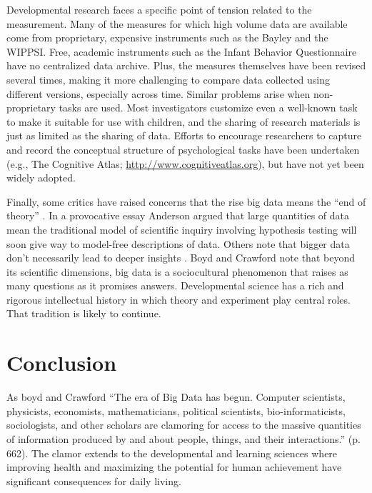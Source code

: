\documentclass[letterpaper,man,apacite,natbib]{apa6}
\begin{document}
Developmental research faces a specific point of tension related to the measurement.
Many of the measures for which high volume data are available come from proprietary, expensive instruments such as the Bayley and the WIPPSI.
Free, academic instruments such as the Infant Behavior Questionnaire have no centralized data archive.
Plus, the measures themselves have been revised several times, making it more challenging to compare data collected using different versions, especially across time.
Similar problems arise when non-proprietary tasks are used.
Most investigators customize even a well-known task to make it suitable for use with children, and the sharing of research materials is just as limited as the sharing of data.
Efforts to encourage researchers to capture and record the conceptual structure of psychological tasks have been undertaken (e.g., The Cognitive Atlas; \url{http://www.cognitiveatlas.org}), but have not yet been widely adopted.

Finally, some critics have raised concerns that the rise big data means the ``end of theory'' \cite{anderson_end_2008}.
In a provocative essay Anderson \citeyear{anderson_end_2008} argued that large quantities of data mean the traditional model of scientific inquiry involving hypothesis testing will soon give way to model-free descriptions of data.
Others note that bigger data don't necessarily lead to deeper insights \cite{graham_big_2012}.
Boyd and Crawford \cite{boyd_critical_2012} note that beyond its scientific dimensions, big data is a sociocultural phenomenon that raises as many questions as it promises answers.
Developmental science has a rich and rigorous intellectual history in which theory and experiment play central roles.
That tradition is likely to continue.

\section{Conclusion}

As boyd and Crawford \citeyear{boyd_critical_2012}  ``The era of Big Data has begun. Computer scientists, physicists, economists, mathematicians, political scientists, bio-informaticists, sociologists, and other scholars are clamoring for access to the massive quantities of information produced by and about people, things, and their interactions.'' (p. 662).
The clamor extends to the developmental and learning sciences where improving health and maximizing the potential for human achievement have significant consequences for daily living.
\end{document}
